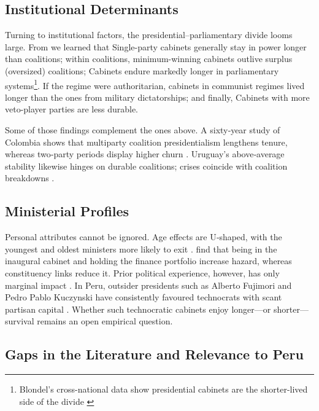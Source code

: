 \documentclass[a4paper, 12pt]{article}
\begin{document}
\subsection{Institutional Determinants}

Turning to institutional factors, the presidential–parliamentary divide looms large.
From \citet{fischer_duration_2012} we learned that Single-party cabinets generally stay in power longer than coalitions; within coalitions, minimum-winning cabinets outlive surplus (oversized) coalitions; Cabinets endure markedly longer in parliamentary systems\footnote{Blondel’s cross-national data show presidential cabinets are the shorter-lived side of the divide \citep{blondel_government_1985}}. If the regime were authoritarian, cabinets in communist regimes lived longer than the ones from military dictatorships; and finally, Cabinets with more veto-player parties are less durable.

Some of those findings complement the ones above.  A sixty‑year study of Colombia shows that multiparty coalition presidentialism lengthens tenure, whereas two‑party periods display higher churn \citep{mejia_es_2021}.  Uruguay’s above‑average stability likewise hinges on durable coalitions; crises coincide with coalition breakdowns \citep{chasquetti_designacion_2013}.


\subsection{Ministerial Profiles}

Personal attributes cannot be ignored.  Age effects are U‑shaped, with the youngest and oldest ministers more likely to exit \citet{fischer_duration_2012}.  \citet{escobar-lemmon_coming_2010} find that being in the inaugural cabinet and holding the finance portfolio increase hazard, whereas constituency links reduce it.  Prior political experience, however, has only marginal impact \citep{escobar-lemmon_coming_2010}.  In Peru, outsider presidents such as Alberto Fujimori and Pedro Pablo Kuczynski have consistently favoured technocrats with scant partisan capital \citep{carreras_presidentes_2013,nercesian_radiografigabinetes_2019}.  Whether such technocratic cabinets enjoy longer—or shorter—survival remains an open empirical question.
% 

\subsection{Gaps in the Literature and Relevance to Peru}
\end{document}
